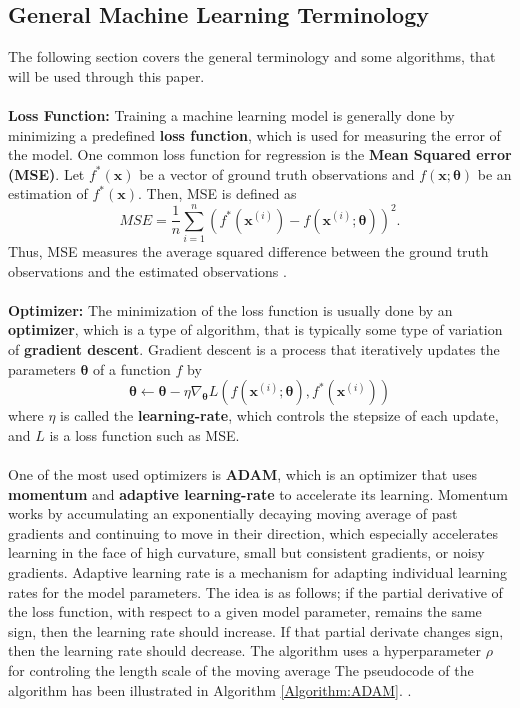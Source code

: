 \documentclass[./main.tex]{subfiles}
\begin{document}
\subsection{General Machine Learning Terminology}
\label{sec:GMLT}
The following section covers the general terminology and some algorithms, that will be used through this paper. 
\\
\\
\noindent \textbf{Loss Function:} Training a machine learning model is generally done by minimizing a predefined \textbf{loss function}, which is used for measuring the error of the model. One common loss function for regression is the \textbf{Mean Squared error (MSE)}. Let $f^*(\bm{x})$ be a vector of ground truth observations and $f(\bm{x}; \bm{\theta})$ be an estimation of $f^*(\bm{x})$. Then, MSE is defined as
\begin{equation}
    MSE = \frac{1}{n} \sum_{i = 1} ^n \left( f^*\left(\bm{x}^{(i)}\right) - f\left(\bm{x}^{(i)}; \bm{\theta}\right)\right)^2.
\end{equation}
Thus, MSE measures the average squared difference between the ground truth observations and the estimated observations \cite{ISL}.
\\
\\
\noindent \textbf{Optimizer:} The minimization of the loss function is usually done by an \textbf{optimizer}, which is a type of algorithm, that is typically some type of variation of \textbf{gradient descent}. Gradient descent is a process that iteratively updates the parameters $\bm{\theta}$ of a function $f$ by
\begin{equation}
    \bm{\theta} \leftarrow \bm{\theta} - \eta \nabla_{\bm{\theta}} L\left( f\left(\bm{x}^{(i)}; \bm{\theta}\right), f^*\left(\bm{x}^{(i)}\right) \right)
\end{equation}
where $\eta$ is called the \textbf{learning-rate}, which controls the stepsize of each update, and $L$ is a loss function such as MSE.
\\
\\
One of the most used optimizers is \textbf{ADAM}, which is an optimizer that uses \textbf{momentum} and \textbf{adaptive learning-rate} to accelerate its learning. Momentum works by accumulating an exponentially decaying moving average of past gradients and continuing to move in their direction, which especially accelerates learning in the face of high curvature, small but consistent gradients, or noisy gradients. Adaptive learning rate is a mechanism for adapting individual learning rates for the model parameters. The idea is as follows; if the partial derivative of the loss function, with respect to a given model parameter, remains the same sign, then the learning rate should increase. If that partial derivate changes sign, then the learning rate should decrease. The algorithm uses a hyperparameter $\rho$ for controling the length scale of the moving average The pseudocode of the algorithm has been illustrated in Algorithm \ref{Algorithm:ADAM}. \cite{DL_book}. 
\end{document}
